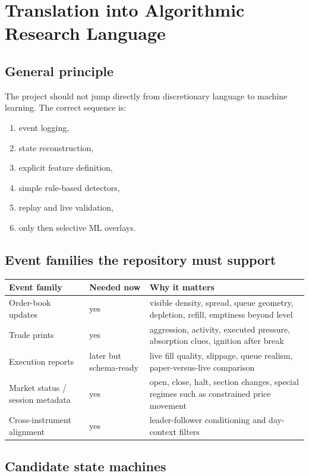 \section{Translation into Algorithmic Research Language}

\subsection{General principle}

The project should not jump directly from discretionary language to machine learning. The correct sequence is:

\begin{enumerate}
\item event logging,
\item state reconstruction,
\item explicit feature definition,
\item simple rule-based detectors,
\item replay and live validation,
\item only then selective ML overlays.
\end{enumerate}

\subsection{Event families the repository must support}

\begin{longtable}{p{}p{}p{}}
\toprule
\textbf{Event family} & \textbf{Needed now} & \textbf{Why it matters} \\
\midrule
Order-book updates & yes & visible density, spread, queue geometry, depletion, refill, emptiness beyond level \\
Trade prints & yes & aggression, activity, executed pressure, absorption clues, ignition after break \\
Execution reports & later but schema-ready & live fill quality, slippage, queue realism, paper-versus-live comparison \\
Market status / session metadata & yes & open, close, halt, section changes, special regimes such as constrained price movement \\
Cross-instrument alignment & yes & leader-follower conditioning and day-context filters \\
\bottomrule
\end{longtable}

\subsection{Candidate state machines}

